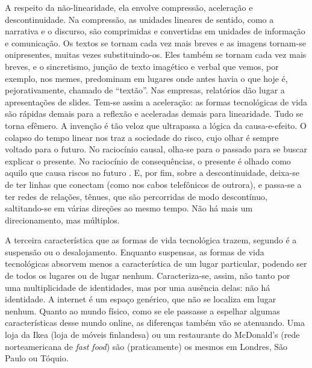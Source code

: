 A respeito da não-linearidade, ela envolve compressão, aceleração e descontinuidade.  Na compressão, as unidades lineares de sentido, como a narrativa e o discurso, são comprimidas e convertidas em unidades de informação e comunicação. Os textos se tornam cada vez mais breves e as imagens tornam-se onipresentes, muitas vezes substituindo-os. Eles também se tornam cada vez mais breves, e o sincretismo, junção de texto imagético e verbal que vemos, por exemplo, nos memes, predominam em lugares onde antes havia o que hoje é, pejorativamente, chamado de “textão”. Nas empresas, relatórios dão lugar a apresentações de slides. Tem-se assim a aceleração: as formas tecnológicas de vida são rápidas demais para a reflexão e aceleradas demais para linearidade. Tudo se torna efêmero. A invenção é tão veloz que ultrapassa a lógica da causa-e-efeito. O colapso do tempo linear nos traz a sociedade do risco, cujo olhar é sempre voltado para o futuro. No raciocínio causal, olha-se para o passado para se buscar explicar o presente. No raciocínio de consequências, o presente é olhado como aquilo que causa riscos no futuro \cite{lash2012}. E, por fim, sobre a descontinuidade, deixa-se de ter linhas que conectam (como nos cabos telefônicos de outrora), e passa-se a ter redes de relações, tênues, que são percorridas de modo descontínuo, saltitando-se em várias direções ao mesmo tempo. Não há mais um direcionamento, mas múltiplos.

A terceira característica que as formas de vida tecnológica trazem, segundo \textcite{lash2012} é a suspensão ou o desalojamento. Enquanto suspensas, as formas de vida tecnológicas absorvem menos a característica de um lugar particular, podendo ser de todos os lugares ou de lugar nenhum. Caracteriza-se, assim, não tanto por uma multiplicidade de identidades, mas por uma ausência delas: não há identidade. A internet é um espaço genérico, que não se localiza em lugar nenhum. Quanto ao mundo físico, como se ele passasse a espelhar algumas características desse mundo online, as diferenças também vão se atenuando. Uma loja da Ikea (loja de móveis finlandesa) ou um restaurante do McDonald’s (rede norteamericana de \textit{fast food}) são (praticamente) os mesmos em Londres, São Paulo ou Tóquio.

